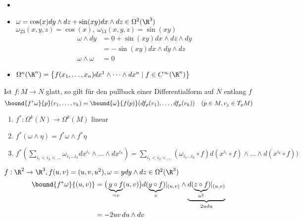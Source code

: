 \begin{exmp*}
	\begin{itemize}
		\item[]
		\item $ \omega = \cos(x) dy \wedge dz + \sin(xy) dx \wedge dz \in \Omega^2(\R^3) $\\
			$ \omega_{23}(x,y,z) = \cos(x),\ \omega_{13}(x,y,z) = \sin(xy) $
			\begin{align*}
				\omega \wedge dy &= 0 +\sin(xy) dx \wedge dz \wedge dy\\
				&= -\sin(xy) dx \wedge dy \wedge dz\\
				\omega \wedge \omega &= 0
			\end{align*}
		
		\item $ \Omega^n(\R^n) = \big\{ f(x_1,\dotsc,x_n) dx^1 \wedge \dots \wedge dx^n \mid f \in C^\infty (\R^n) \big\} $
	\end{itemize}
\end{exmp*}

\begin{lem}
	Ist $ f: M \to N $ glatt, so gilt für den pullback einer Differentialform auf $N$ entlang $f$
	\[ \bound{f^*\omega}{p} (v_1,\dotsc,v_k) = \bound{\omega}{f(p)} (df_p(v_1),\dots, df_p(v_k)) \quad (p \in M, v_j \in T_pM) \]
	\begin{enumerate}[label={\roman*})]
		\item $ f^*: \Omega^k(N) \to \Omega^k(M) $ linear
		\item $ f^*(\omega \wedge \eta) = f^*\omega \wedge f^*\eta $
		\item $ f^*\left(\sum\limits_{i_1 < i_2<\dots} \omega_{i_1\dots i_k} dx^{i_1} \wedge \dots \wedge dx^{i_k}\right) = \sum\limits_{i_1<i_2<\dots} ( \omega_{i_1\dots i_k} \circ f) d(x^{i_1} \circ f) \wedge \dots \wedge d(x^{i_k} \circ f) ) $
	\end{enumerate}
\end{lem}

\begin{exmp*}
	$ f: \R^2 \to \R^3, f(u,v) = (u,v,u^2), \omega = y dy \wedge dz \in \Omega^2(\R^3) $
	\begin{align*}
		\bound{f^*\omega}{(u,v)} &= \big(\underbrace{y \circ f}_{=v}(u,v) \big) d(\underbrace{y \circ f}_{v} )|_{(u,v)} \wedge \underbrace{d(\underbrace{z \circ f}_{u^2})|_{(u,v)}}_{2udu}\\
		&= -2uv\, du \wedge dv
	\end{align*}
\end{exmp*}

